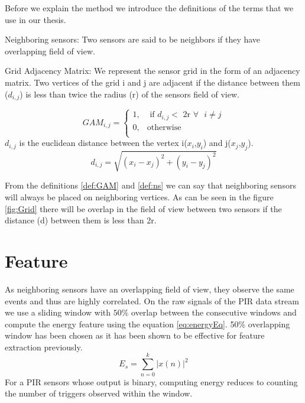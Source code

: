 Before we explain the method we introduce the definitions of the terms that we use in our thesis.\\
\begin{definition}{Neighboring sensors:}
 Two sensors are said to be neighbors if they have overlapping field of view.
\label{def:ns}
\end{definition}
\begin{definition}{Grid Adjacency Matrix:}
 We represent the sensor grid in the form of an adjacency matrix. Two vertices of the grid i and j are adjacent if the distance between them ($d_{i,j}$) is less than twice the radius (r) of the sensors field of view.

\[
GAM_{i,j} = 
\begin{cases}
1, &\text{ if } d_{i,j} < \text{  2r } \forall \text{ } i \ne j\\
0, & \text{otherwise}\\
\end{cases}
    \]
$d_{i,j}$  is the euclidean distance between the vertex i($x_i$,$y_i$) and j($x_j$,$y_j$).
\begin{equation*}
d_{i,j}=\sqrt{(x_i-x_j)^2 + (y_i-y_j)^2}
\end{equation*}
\label{def:GAM}
\end{definition}
From the definitions \ref{def:GAM} and \ref{def:ns} we can say that neighboring sensors will always be placed on neighboring vertices. As can be seen in the figure \ref{fig:Grid} there will be overlap in the field of view between two sensors if the distance (d) between them is less than 2r.

\section{Feature}
As neighboring sensors have an overlapping field of view, they observe the same events and thus are highly correlated.
On the raw signals of the PIR data stream we use a sliding window with $50\%$ overlap between the consecutive windows and compute the energy feature using the equation \ref{eq:energyEq}. 50\% overlapping window has been chosen as it has been shown to be effective for feature extraction previously\cite{bao2004activity}.
\begin{equation}
\label{eq:energyEq}
E_s = {\sum_{n=0}^{k}{|x(n)|}^2}
\end{equation}
For a PIR sensors whose output is binary, computing energy reduces to counting the number of triggers observed within the window.

